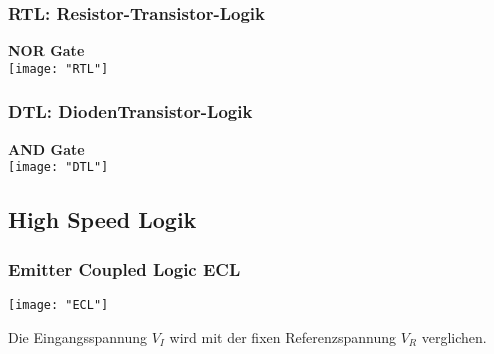 \begin{minipage}[t]{0.3\textwidth}
	\vspace{0pt}								%
	\subsubsection{RTL: Resistor-Transistor-Logik}
	\textbf{NOR Gate}\\
	\texttt{[image: "RTL"]}
\end{minipage}\hspace{0.05\textwidth}
\begin{minipage}[t]{0.3\textwidth}
	\vspace{0pt}								%
	\subsubsection{DTL: DiodenTransistor-Logik}
	\textbf{AND Gate}\\
	\texttt{[image: "DTL"]}
\end{minipage}
\vspace{2mm}


\subsection{High Speed Logik}
\subsubsection{Emitter Coupled Logic ECL}
\begin{minipage}[t]{0.45\textwidth}
	\vspace{0pt}								%
	\texttt{[image: "ECL"]}
\end{minipage}\hspace{0.05\textwidth}
\begin{minipage}[t]{0.45\textwidth}
	\vspace{0pt}								%
	Die Eingangsspannung $V_I$ wird mit der fixen Referenzspannung $V_R$ verglichen.
\end{minipage}
\vspace{2mm}


